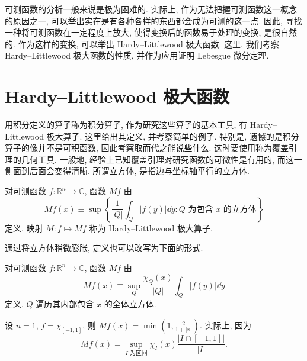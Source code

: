 
可测函数的分析一般来说是极为困难的. 实际上, 作为无法把握可测函数这一概念的原因之一, 可以举出实在是有各种各样的东西都会成为可测的这一点. 因此, 寻找一种将可测函数在一定程度上放大, 使得变换后的函数易于处理的变换, 是很自然的. 作为这样的变换, 可以举出 Hardy--Littlewood 极大函数. 这里, 我们考察 Hardy--Littlewood 极大函数的性质, 并作为应用证明 Lebesgue 微分定理.

\section{Hardy--Littlewood 极大函数}\label{sec:3.1}










用积分定义的算子称为积分算子, 作为研究这些算子的基本工具, 有 Hardy--Littlewood 极大算子. 这里给出其定义, 并考察简单的例子. 特别是, 遗憾的是积分算子的像并不是可积函数, 因此考察取而代之能说些什么. 这时要使用称为覆盖引理的几何工具. 一般地, 经验上已知覆盖引理对研究函数的可微性是有用的, 而这一侧面到后面会变得清晰. 所谓立方体, 是指边与坐标轴平行的立方体.

\begin{definition}\label{def:3.1}
对可测函数 $f: \mathbb{R}^{n} \to \mathbb{C}$, 函数 $Mf$ 由
\[
Mf(x) \equiv \sup\left\{\frac{1}{|Q|}\int_{Q}|f(y)|\dd y : Q \text{ 为包含 } x \text{ 的立方体}\right\}
\]
定义. 映射 $M: f \mapsto Mf$ 称为 Hardy--Littlewood 极大算子.
\end{definition}

通过将立方体稍微膨胀, 定义也可以改写为下面的形式.

\begin{definition}\label{def:3.2}
对可测函数 $f: \mathbb{R}^{n} \to \mathbb{C}$, 函数 $Mf$ 由
\begin{equation}\tag{3.1}
Mf(x) \equiv \sup_{Q}\frac{\chi_{Q}(x)}{|Q|}\int_{Q}|f(y)|\dd y
\label{eq:3.1}
\end{equation}
定义. $Q$ 遍历其内部包含 $x$ 的全体立方体.
\end{definition}

\begin{example}\label{exa:3.1}
设 $n = 1$, $f = \chi_{[-1,1]}$, 则 $Mf(x) = \min\left(1, \frac{2}{1+|x|}\right)$. 实际上, 因为
\[
Mf(x) = \sup_{I \text{ 为区间}}\chi_{I}(x)\frac{|I \cap [-1,1]|}{|I|}.
\]
\end{example}


